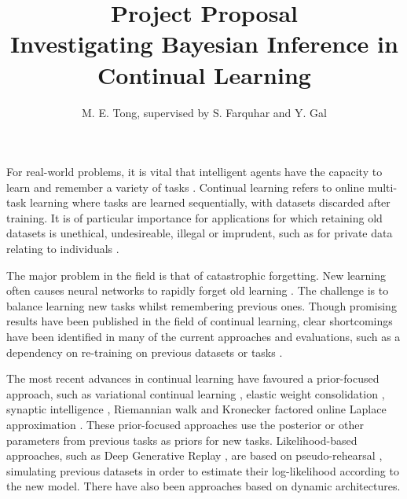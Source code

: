 \documentclass[a4paper,10pt]{article}
\title{\vspace*{-2.45em}\textbf{Project Proposal}\\ \vspace{0.25em} \Large Investigating Bayesian Inference in Continual Learning\vspace*{-0.9em}}
\author{M. E. Tong, supervised by S. Farquhar and Y. Gal}
\date{}
\begin{document}
\maketitle


\vspace{-1.5em}
For real-world problems, it is vital that intelligent agents have the capacity to learn and remember a variety of tasks \cite{ewc}. Continual learning refers to online multi-task learning where tasks are learned sequentially, with datasets discarded after training. It is of particular importance for applications for which retaining old datasets is unethical, undesireable, illegal or imprudent, such as for private data relating to individuals \cite{unifying, robust}.

The major problem in the field is that of catastrophic forgetting. New learning often causes neural networks to rapidly forget old learning \cite{catastrophic}. The challenge is to balance learning new tasks whilst remembering previous ones. Though promising results have been published in the field of continual learning, clear shortcomings have been identified in many of the current approaches and evaluations, such as a dependency on re-training on previous datasets or tasks \cite{robust}. 

The most recent advances in continual learning have favoured a prior-focused approach, such as variational continual learning \cite{vcl}, elastic weight consolidation \cite{ewc}, synaptic intelligence \cite{si}, Riemannian walk \cite{rw} and Kronecker factored online Laplace approximation \cite{ritter}. These prior-focused approaches use the posterior or other parameters from previous tasks as priors for new tasks. Likelihood-based approaches, such as Deep Generative Replay \cite{dgr}, are based on pseudo-rehearsal \cite{robins}, simulating previous datasets in order to estimate their log-likelihood according to the new model. There have also been approaches based on dynamic architectures. %

\end{document}
